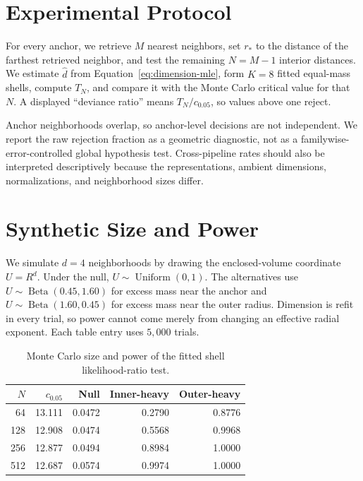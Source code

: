 \documentclass[11pt]{article}
\begin{document}
\section{Experimental Protocol}

For every anchor, we retrieve $M$ nearest neighbors, set $r_\ast$ to the
distance of the farthest retrieved neighbor, and test the remaining $N=M-1$
interior distances. We estimate $\widehat d$ from Equation~\eqref{eq:dimension-mle},
form $K=8$ fitted equal-mass shells, compute $T_N$, and compare it with the
Monte Carlo critical value for that $N$. A displayed ``deviance ratio'' means
$T_N/c_{0.05}$, so values above one reject.

Anchor neighborhoods overlap, so anchor-level decisions are not independent.
We report the raw rejection fraction as a geometric diagnostic, not as a
familywise-error-controlled global hypothesis test. Cross-pipeline rates should
also be interpreted descriptively because the representations, ambient
dimensions, normalizations, and neighborhood sizes differ.

\section{Synthetic Size and Power}

We simulate $d=4$ neighborhoods by drawing the enclosed-volume coordinate
$U=R^d$. Under the null, $U\sim\operatorname{Uniform}(0,1)$. The alternatives
use $U\sim\operatorname{Beta}(0.45,1.60)$ for excess mass near the anchor and
$U\sim\operatorname{Beta}(1.60,0.45)$ for excess mass near the outer radius.
Dimension is refit in every trial, so power cannot come merely from changing an
effective radial exponent. Each table entry uses $5{,}000$ trials.

\begin{table}[H]
\centering
\caption{Monte Carlo size and power of the fitted shell likelihood-ratio test.}
\label{tab:synthetic}
\begin{tabular}{rrrrr}
\toprule
$N$ & $c_{0.05}$ & Null & Inner-heavy & Outer-heavy \\
\midrule
64  & 13.111 & 0.0472 & 0.2790 & 0.8776 \\
128 & 12.908 & 0.0474 & 0.5568 & 0.9968 \\
256 & 12.877 & 0.0494 & 0.8984 & 1.0000 \\
512 & 12.687 & 0.0574 & 0.9974 & 1.0000 \\
\bottomrule
\end{tabular}
\end{table}
\end{document}

